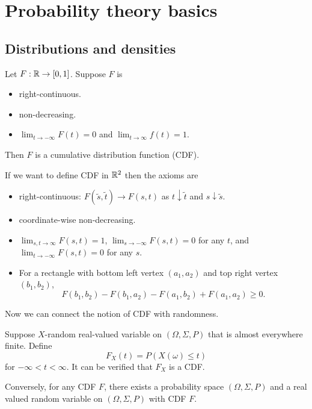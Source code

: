 \documentclass[a4paper]{article}
\begin{document}
\section{Probability theory basics}

\subsection{Distributions and densities}

\begin{defi}
  Let $F : \mathbb{R} \to [0, 1]$. Suppose $F$ is
  \begin{itemize}
    \item right-continuous.
    \item non-decreasing.
    \item $\lim_{t \to -\infty} F(t) = 0$ and
    $\lim_{t \to \infty} f(t) = 1$.
  \end{itemize}
  Then $F$ is a cumulative distribution function (CDF).
\end{defi}

\begin{remark}
  If we want to define CDF in $\mathbb{R}^2$ then the axioms are
  \begin{itemize}
    \item right-continuous: $F(\tilde{s}, \tilde{t})
    \to F(s, t)$ as $t \downarrow \tilde{t}$ and
    $s \downarrow \tilde{s}$.
    \item coordinate-wise non-decreasing.
    \item $\lim_{s, t \to \infty} F(s, t) = 1$,
    $\lim_{s \to -\infty} F(s, t) = 0$ for any $t$, and
    $\lim_{t \to - \infty} F (s, t) = 0$ for any $s$.
    \item For a rectangle with bottom left vertex $(a_1, a_2)$
    and top right vertex $(b_1, b_2)$,
    \[
    F(b_1, b_2) - F(b_1, a_2) - F(a_1, b_2) + F(a_1, a_2) \geq 0.
    \]
  \end{itemize}
\end{remark}

Now we can connect the notion of CDF with randomness.

Suppose $X$-random real-valued variable on $(\Omega, \Sigma, P)$
that is almost everywhere finite. Define
\[
F_X (t) = P \left( X(\omega) \leq t \right)
\]
for $- \infty < t < \infty$. It can be verified that
$F_X$ is a CDF.

Conversely, for any CDF $F$, there exists a probability space
$(\Omega, \Sigma, P)$ and a real valued random variable
on $(\Omega, \Sigma, P)$ with CDF $F$.
\end{document}

